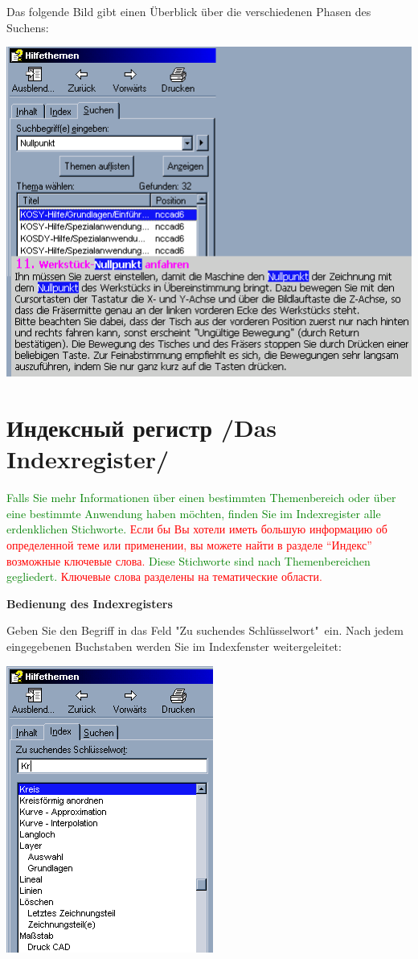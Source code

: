 \documentclass[14pt,a4paper]{book}
\newcommand{\DE}[1]{\textcolor{green}{#1}}
\newcommand{\RU}[1]{\textcolor{red}{#1}}
\newcommand{\TRchapter}[2]{\chapter{#2 /#1/}}
\begin{document}
\bigskip

Das folgende Bild gibt einen Überblick über die verschiedenen Phasen des Suchens:

\includegraphics{pic/Suche1.png}

\TRchapter{Das Indexregister}{Индексный регистр}

\DE{Falls Sie mehr Informationen über einen bestimmten Themenbereich oder über
eine bestimmte Anwendung haben möchten, finden Sie im Indexregister alle
erdenklichen Stichworte.}
\RU{Если бы Вы хотели иметь большую информацию об определенной теме или
применении, вы можете найти в разделе ``Индекс'' возможные ключевые слова.}
\DE{Diese Stichworte sind nach Themenbereichen
gegliedert.}
\RU{Ключевые слова разделены на тематические области.}

\bigskip

\textbf{Bedienung des Indexregisters}

\bigskip

Geben Sie den Begriff in das Feld "Zu suchendes Schlüsselwort"\ ein. 
Nach jedem
eingegebenen Buchstaben werden Sie im Indexfenster weitergeleitet:

\includegraphics{pic/Suche2.png}
\end{document}
